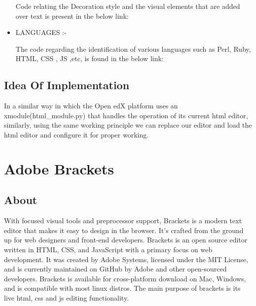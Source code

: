\begin{itemize}
\begin{center}
Code relating the Decoration style and the visual elements that are added over text is
present in the below link:  
\end{center}
\item LANGUAGES :-  \newline
\begin{center}
The code regarding the identification of various languages such as Perl, Ruby,
HTML, CSS , JS ,etc, is found in the below link:  
\end{center}
\end{itemize}
\subsection{Idea Of Implementation }
In a similar way in which the Open edX platform uses an xmodule(html\_module.py) that
handles the operation of its current html editor, similarly, using the same working principle
we can replace our editor and load the html editor and configure it for proper working.  \newline

\section{Adobe Brackets}
\subsection{About}
With focused visual tools and preprocessor support, Brackets is a modern text editor that
makes it easy to design in the browser. It's crafted from the ground up for web designers and
front-end developers. \newline 
Brackets is an open source editor written in HTML, CSS, and JavaScript with a primary
focus on web development. It was created by Adobe Systems, licensed under the MIT
License, and is currently maintained on GitHub by Adobe and other open-sourced
developers. Brackets is available for cross-platform download on Mac, Windows, and is
compatible with most linux distros. The main purpose of brackets is its live html, css and js
editing functionality.
